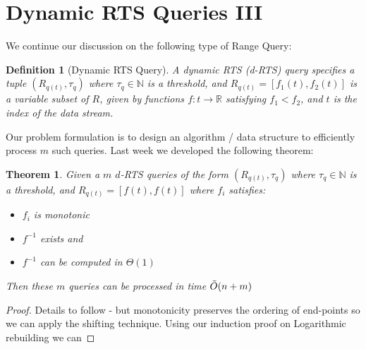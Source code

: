 \documentclass{article}
\newtheorem{theorem}{Theorem}[section]
\newtheorem{definition}{Definition}
\begin{document}
\hspace{95mm}

\section*{Dynamic RTS Queries III}

We continue our discussion on the following type of Range Query: 

\begin{definition}[Dynamic RTS Query] A dynamic RTS (\textit{d-RTS}) query specifies a tuple $(R_{q(t)}, \tau_q)$ where $\tau_q \in \mathbb{N}$
    is a threshold, and $R_{q(t)} =[f_1(t), f_2(t)]$ is a variable subset of $R$, given by functions $f: t\rightarrow\mathbb{R}$ satisfying $f_1 < f_2$, and $t$ is the index of the data stream.
\end{definition}

Our problem formulation is to design an algorithm / data structure to efficiently process $m$ such queries. Last week we developed the following theorem: 

\begin{theorem}
    Given a $m$ $d$-RTS queries of the form     $(R_{q(t)}, \tau_q)$ where $\tau_q \in \mathbb{N}$
    is a threshold, and $R_{q(t)} =[f(t), f(t)]$ where $f_i$ satisfies: 
    \begin{itemize}
        \item $f_i$ is monotonic 
        \item $f^{-1}$ exists and
        \item $f^{-1}$ can be computed in $\Theta(1)$
    \end{itemize}
    Then these $m$ queries can be processed in time $\Tilde{O}(n+m)$
\end{theorem}
\begin{proof}
    Details to follow - but monotonicity preserves the ordering of end-points so we can apply the shifting technique. Using our induction proof on Logarithmic rebuilding we can
\end{proof}
\end{document}
